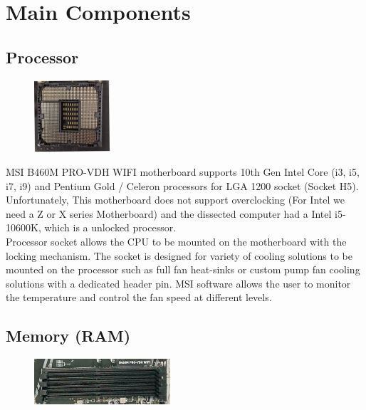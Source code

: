 \documentclass{article}
\begin{document}
\section{Main Components}

\subsection{Processor}
\begin{figure}
	\centering
	\includegraphics[width=0.25\textwidth]{socket-modified.png}
\end{figure}

MSI B460M PRO-VDH WIFI motherboard supports 10th Gen Intel Core (i3, i5, i7, i9) and
Pentium Gold / Celeron processors for LGA 1200 socket (Socket H5). Unfortunately, This
motherboard does not support overclocking (For Intel we need a Z or X series Motherboard) 
and the dissected computer had a Intel i5-10600K, which is a unlocked processor. 
\\
Processor socket allows the CPU to be mounted on the motherboard with the locking
mechanism. The socket is designed for variety of cooling solutions to be mounted on 
the processor such as full fan heat-sinks or custom pump fan cooling solutions with a
dedicated header pin. MSI software allows the user to monitor the temperature and control
the fan speed at different levels.   




\subsection{Memory (RAM)}

\begin{figure}
	\vspace{-30pt} 
	\centering
	\includegraphics[width=0.45\textwidth]{ram.jpg}
\end{figure}
\end{document}
